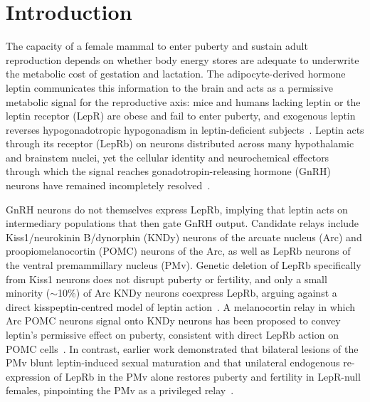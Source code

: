 \section{Introduction}

The capacity of a female mammal to enter puberty and sustain adult reproduction depends on whether body energy stores are adequate to underwrite the metabolic cost of gestation and lactation. The adipocyte-derived hormone leptin communicates this information to the brain and acts as a permissive metabolic signal for the reproductive axis: mice and humans lacking leptin or the leptin receptor (LepR) are obese and fail to enter puberty, and exogenous leptin reverses hypogonadotropic hypogonadism in leptin-deficient subjects~\cite{ahima1997leptin,farooqi2014twenty}. Leptin acts through its receptor (LepRb) on neurons distributed across many hypothalamic and brainstem nuclei, yet the cellular identity and neurochemical effectors through which the signal reaches gonadotropin-releasing hormone (GnRH) neurons have remained incompletely resolved~\cite{louis2011molecular}.

GnRH neurons do not themselves express LepRb, implying that leptin acts on intermediary populations that then gate GnRH output. Candidate relays include Kiss1/neurokinin B/dynorphin (KNDy) neurons of the arcuate nucleus (Arc) and proopiomelanocortin (POMC) neurons of the Arc, as well as LepRb neurons of the ventral premammillary nucleus (PMv). Genetic deletion of LepRb specifically from Kiss1 neurons does not disrupt puberty or fertility, and only a small minority ($\sim$10\%) of Arc KNDy neurons coexpress LepRb, arguing against a direct kisspeptin-centred model of leptin action~\cite{donato2011leptin,cravo2011kiss1,louis2011molecular,true2011leptin}. A melanocortin relay in which Arc POMC neurons signal onto KNDy neurons has been proposed to convey leptin's permissive effect on puberty, consistent with direct LepRb action on POMC cells~\cite{manfredilozano2016defining,berglund2012direct}. In contrast, earlier work demonstrated that bilateral lesions of the PMv blunt leptin-induced sexual maturation and that unilateral endogenous re-expression of LepRb in the PMv alone restores puberty and fertility in LepR-null females, pinpointing the PMv as a privileged relay~\cite{donato2011leptin,mahany2018obesity}.

